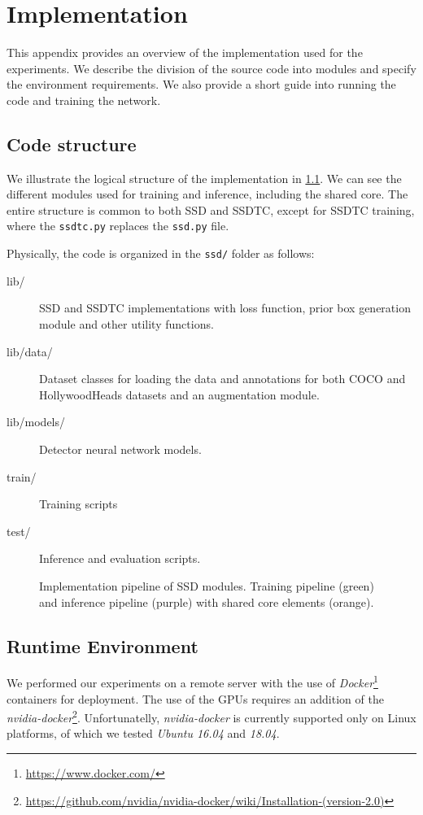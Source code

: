 \chapter{Implementation}
\label{app:impl}

This appendix provides an overview of the implementation used for the experiments. We describe the division of the source code into modules and specify the environment requirements. We also provide a short guide into running the code and training the network.

\section{Code structure}
We illustrate the logical structure of the implementation in \cref{fig:logcode}. We can see the different modules used for training and inference, including the shared core. The entire structure is common to both SSD and SSDTC, except for SSDTC training, where the {\tt ssdtc.py} replaces the {\tt ssd.py} file.

Physically, the code is organized in the {\tt ssd/} folder as follows:
\begin{description}
\item[lib/] SSD and SSDTC implementations with loss function, prior box generation module and other utility functions.
\item[lib/data/] Dataset classes for loading the data and annotations for both COCO and HollywoodHeads datasets and an augmentation module.
\item[lib/models/] Detector neural network models.
\item[train/] Training scripts
\item[test/] Inference and evaluation scripts.
\end{description}



\begin{figure}
    \centering
    \modules
    \caption[Implementation pipeline of SSD modules]{Implementation pipeline of SSD modules. Training pipeline (green) and inference pipeline (purple) with shared core elements (orange).}
    \label{fig:logcode}
\end{figure}


\section{Runtime Environment}
We performed our experiments on a remote server with the use of \textit{Docker}\footnote{\url{https://www.docker.com/}} containers for deployment. The use of the GPUs requires an addition of the \textit{nvidia-docker}\footnote{\url{https://github.com/nvidia/nvidia-docker/wiki/Installation-(version-2.0)}}. Unfortunatelly, \textit{nvidia-docker} is currently supported only on Linux platforms, of which we tested \textit{Ubuntu 16.04} and \textit{18.04}.

